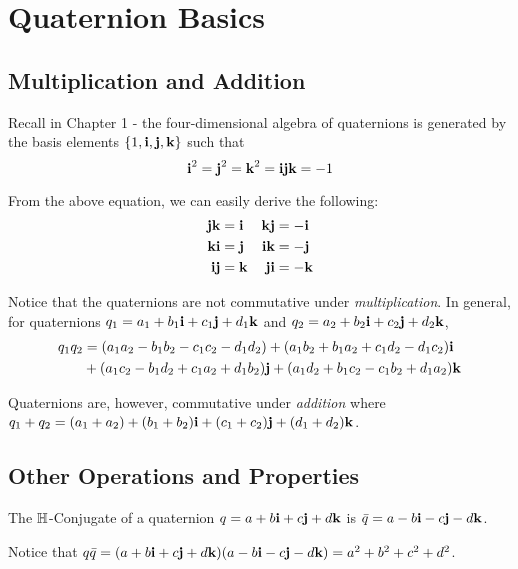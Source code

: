 \section{Quaternion Basics}

\subsection{Multiplication and Addition}

Recall in Chapter 1 - the four-dimensional algebra of quaternions is generated by the basis elements $\{1,\textbf{i},\textbf{j},\textbf{k}\}$ such that 
\begin{equation} \label{quat_eq}
\textbf{i}^2 = \textbf{j}^2 = \textbf{k}^2 = \textbf{i} \textbf{j} \textbf{k} = -1
\end{equation}

From the above equation, we can easily derive the following:
\begin{align*}
	\textbf{j}\textbf{k} &= \textbf{i} & \textbf{k}\textbf{j} &= -\textbf{i} \\
	\textbf{k}\textbf{i} &= \textbf{j} & \textbf{i}\textbf{k} &= -\textbf{j} \\
	\textbf{i}\textbf{j} &= \textbf{k} & \textbf{j}\textbf{i} &= -\textbf{k}
\end{align*}

Notice that the quaternions are not commutative under \emph{multiplication}. In general, for quaternions $q_1 = a_1 + b_1\textbf{i} + c_1\textbf{j} + d_1\textbf{k}$ and $q_2 = a_2 + b_2\textbf{i} + c_2\textbf{j} + d_2\textbf{k}$, 
\begin{align*}
	q_1q_2 &= (a_1a_2 - b_1b_2 - c_1c_2 - d_1d_2) + (a_1b_2 + b_1a_2 + c_1d_2 - d_1c_2)\textbf{i} \\
		   &+ (a_1c_2 - b_1d_2 + c_1a_2 + d_1b_2)\textbf{j} + (a_1d_2 + b_1c_2 - c_1b_2 + d_1a_2)\textbf{k}
\end{align*}


Quaternions are, however, commutative under \emph{addition} where $q_1+q_2 = (a_1+a_2) + (b_1+b_2)\textbf{i} + (c_1+c_2)\textbf{j} + (d_1+d_2)\textbf{k}$.

\subsection{Other Operations and Properties}

\begin{definition}[$\HH$-Conjugate]
	The $\HH$-Conjugate of a quaternion $q = a + b\textbf{i} + c\textbf{j} + d\textbf{k}$ is $\bar{q} = a - b\textbf{i} - c\textbf{j} - d\textbf{k}$.
\end{definition}

\begin{remark}
	Notice that $q\bar{q} = (a + b\textbf{i} + c\textbf{j} + d\textbf{k})(a - b\textbf{i} -c\textbf{j}-d\textbf{k}) = a^2+b^2+c^2+d^2$.
\end{remark}

